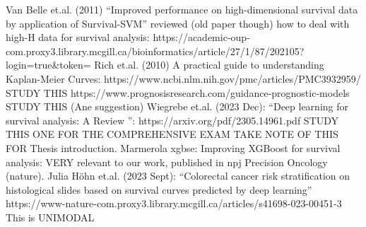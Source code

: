 \documentclass{article}%
\begin{document}
\newline%
\newline%
%
Van Belle et.al. (2011) “Improved performance on high{-}dimensional survival data by application of Survival{-}SVM” reviewed (old paper though) how to deal with high{-}H data for survival analysis: https://academic{-}oup{-}com.proxy3.library.mcgill.ca/bioinformatics/article/27/1/87/202105?login=true\&token= %
\newline%
\newline%
%
Rich et.al. (2010) A practical guide to understanding Kaplan{-}Meier Curves: https://www.ncbi.nlm.nih.gov/pmc/articles/PMC3932959/ %
\newline%
\newline%
%
STUDY THIS %
\newline%
\newline%
%
https://www.prognosisresearch.com/guidance{-}prognostic{-}models %
\newline%
\newline%
%
STUDY THIS (Ane suggestion) %
\newline%
\newline%
%
Wiegrebe et.al. (2023 Dec): “Deep learning for survival analysis: A Review ”: https://arxiv.org/pdf/2305.14961.pdf%
\newline%
\newline%
%
STUDY THIS ONE FOR THE COMPREHENSIVE EXAM %
\newline%
\newline%
%
TAKE NOTE OF THIS FOR Thesis introduction. %
\newline%
\newline%
%
%
\newline%
\newline%
%
%
\newline%
\newline%
%
Marmerola xgbse: Improving XGBoost for survival analysis: %
\newline%
\newline%
%
VERY relevant to our work, published in npj Precision Oncology (nature). %
\newline%
\newline%
%
Julia Höhn et.al. (2023 Sept): “Colorectal cancer risk stratification on histological slides based on survival curves predicted by deep learning” https://www{-}nature{-}com.proxy3.library.mcgill.ca/articles/s41698{-}023{-}00451{-}3 %
\newline%
\newline%
%
This is UNIMODAL%
\newline%
\end{document}
